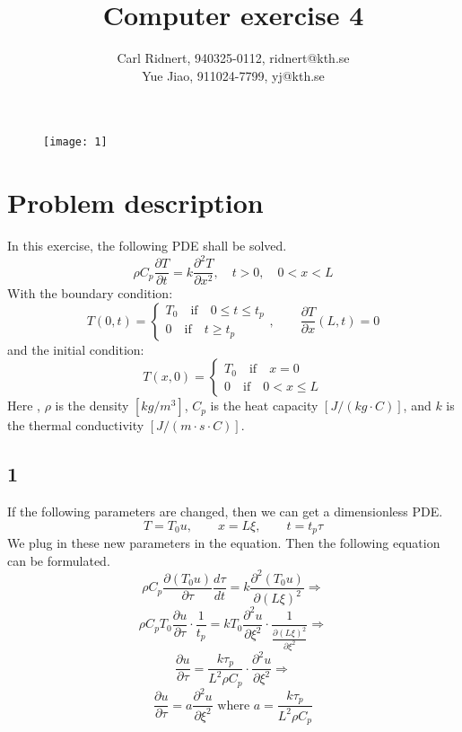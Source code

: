 \documentclass[11pt,a4paper,roman]{scrartcl}
\title{Computer exercise 4}
\date{}
\author{Carl Ridnert, 940325-0112, ridnert@kth.se \\
Yue Jiao, 911024-7799, yj@kth.se}
\begin{document}
\maketitle
\begin{figure}[h]
\centering
\texttt{[image: 1]}
\end{figure}
\newpage

\section*{Problem description}
In this exercise, the following PDE shall be solved.
\begin{equation}
\rho C_p \frac{\partial T}{\partial t} = k\frac{\partial^2 T}{\partial x^2}, \quad t>0, \quad 0<x<L
\end{equation}
With the boundary condition:
\begin{equation}
T\left(0,t\right) = 
\begin{cases} 
T_0 \quad \textrm{if} \quad 0\leq t \leq t_p \\
0 \quad \textrm{if} \quad t \geq t_p
\end{cases}, \qquad \frac{\partial T}{\partial x} \left(L, t\right) = 0
\end{equation}
and the initial condition:
\begin{equation}
T\left(x,0\right) = \begin{cases}
T_0 \quad \textrm{if} \quad x = 0 \\
0 \quad \textrm{if} \quad 0 < x \leq L
\end{cases}
\end{equation}
Here , $\rho$ is the density $\left[kg/m^3\right]$, $C_p$ is the heat capacity $\left[J/(kg\cdot C)\right]$, and $k$ is the thermal conductivity $\left[J/(m\cdot s\cdot C)\right]$. 

\subsection*{1}
If the following parameters are changed, then we can get a dimensionless PDE. 
\begin{equation}
T =T_0 u , \qquad x=L\xi, \qquad t = t_p\tau
\end{equation}
We plug in these new parameters in the equation. Then the following equation can be formulated.
\[
\rho C_p \frac{\partial(T_0 u)}{\partial\tau} \frac{d\tau}{dt} = k \frac{\partial^2(T_0 u)}{\partial(L\xi)^2} \Rightarrow
\]
\[
\rho C_p T_0 \frac{\partial u}{\partial \tau}\cdot \frac{1}{t_p} = k T_0 \frac{\partial^2 u}{\partial \xi^2}\cdot\frac{1}{\frac{\partial(L\xi)^2}{\partial \xi^2}} \Rightarrow
\]
\[
\frac{\partial u}{\partial \tau} = \frac{k\tau_p}{L^2 \rho C_p} \cdot \frac{\partial^2 u}{\partial \xi^2} \Rightarrow
\]
\begin{equation}
\frac{\partial u}{\partial \tau} =  a \frac{\partial^2 u}{\partial \xi^2} \textrm{ where } a = \frac{k\tau_p}{L^2 \rho C_p}
\end{equation}
\end{document}
